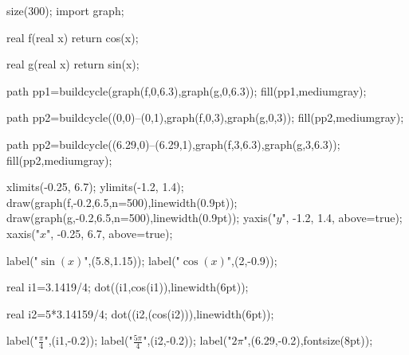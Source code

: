	size(300);  
    import graph;

    real f(real x)
    {
    	return cos(x);
    }
    
    real g(real x)
    {
    	return sin(x);
    }
    
    
    
    path pp1=buildcycle(graph(f,0,6.3),graph(g,0,6.3));
    fill(pp1,mediumgray);
    
    path pp2=buildcycle((0,0)--(0,1),graph(f,0,3),graph(g,0,3));
    fill(pp2,mediumgray);
    
    path pp2=buildcycle((6.29,0)--(6.29,1),graph(f,3,6.3),graph(g,3,6.3));
    fill(pp2,mediumgray);
    
    xlimits(-0.25, 6.7);
	ylimits(-1.2, 1.4);
    draw(graph(f,-0.2,6.5,n=500),linewidth(0.9pt));
    draw(graph(g,-0.2,6.5,n=500),linewidth(0.9pt));
	yaxis("$y$", -1.2, 1.4, above=true);
	xaxis("$x$", -0.25, 6.7, above=true);
	
	label("$\sin(x)$",(5.8,1.15));
	label("$\cos(x)$",(2,-0.9));
	
	real i1=3.1419/4;
	dot((i1,cos(i1)),linewidth(6pt));
	
	real i2=5*3.14159/4;
	dot((i2,(cos(i2))),linewidth(6pt));

	label("$\frac{\pi}{4}$",(i1,-0.2));
	label("$\frac{5\pi}{4}$",(i2,-0.2));
	label("$2\pi$",(6.29,-0.2),fontsize(8pt));